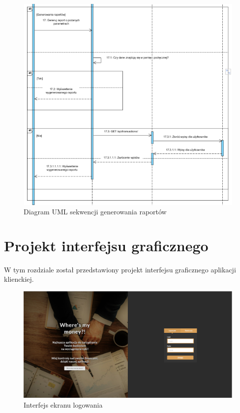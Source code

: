 \documentclass{article}
\begin{document}
	\begin{figure}[H]

		\hspace*{-1.5cm}
		\includegraphics[scale=0.9]{assets/sq8.png}
		\caption[]{Diagram UML sekwencji generowania raportów}
		\label{fig:umlrap}
	\end{figure}

	\section{Projekt interfejsu graficznego}
	\paragraph*{} W tym rozdziale został przedstawiony projekt interfejsu graficznego aplikacji klienckiej.

	\begin{figure}[H]
		\vspace*{-2cm}
		\hspace*{-4cm}
		\includegraphics[scale=0.4]{assets/log.png}
		\caption[]{Interfejs ekranu logowania}
		\label{fig:logowanie}
	\end{figure}
\end{document}
